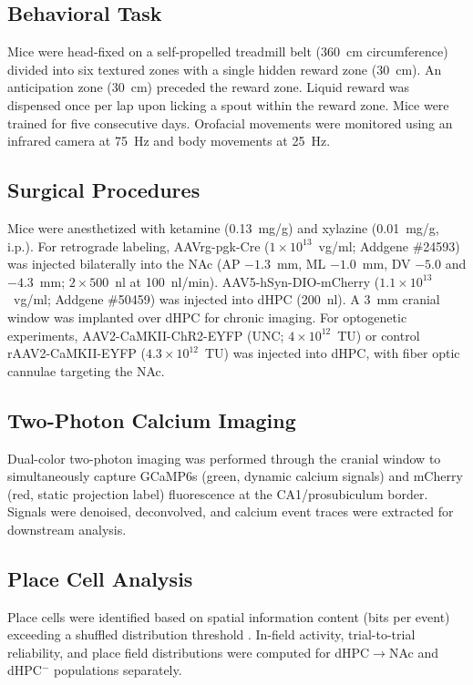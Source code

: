 \documentclass[11pt]{article}
\begin{document}
\subsection{Behavioral Task}

Mice were head-fixed on a self-propelled treadmill belt (360~cm circumference) divided into six textured zones with a single hidden reward zone (30~cm). An anticipation zone (30~cm) preceded the reward zone. Liquid reward was dispensed once per lap upon licking a spout within the reward zone. Mice were trained for five consecutive days. Orofacial movements were monitored using an infrared camera at 75~Hz and body movements at 25~Hz.

\subsection{Surgical Procedures}

Mice were anesthetized with ketamine (0.13~mg/g) and xylazine (0.01~mg/g, i.p.). For retrograde labeling, AAVrg-pgk-Cre ($1 \times 10^{13}$~vg/ml; Addgene \#24593) was injected bilaterally into the NAc (AP $-1.3$~mm, ML $-1.0$~mm, DV $-5.0$ and $-4.3$~mm; $2 \times 500$~nl at 100~nl/min). AAV5-hSyn-DIO-mCherry ($1.1 \times 10^{13}$~vg/ml; Addgene \#50459) was injected into dHPC (200~nl). A 3~mm cranial window was implanted over dHPC for chronic imaging. For optogenetic experiments, AAV2-CaMKII-ChR2-EYFP (UNC; $4 \times 10^{12}$~TU) or control rAAV2-CaMKII-EYFP ($4.3 \times 10^{12}$~TU) was injected into dHPC, with fiber optic cannulae targeting the NAc.

\subsection{Two-Photon Calcium Imaging}

Dual-color two-photon imaging was performed through the cranial window to simultaneously capture GCaMP6s (green, dynamic calcium signals) and mCherry (red, static projection label) fluorescence at the CA1/prosubiculum border. Signals were denoised, deconvolved, and calcium event traces were extracted for downstream analysis.

\subsection{Place Cell Analysis}

Place cells were identified based on spatial information content (bits per event) exceeding a shuffled distribution threshold \citep{Skaggs1993}. In-field activity, trial-to-trial reliability, and place field distributions were computed for dHPC$\to$NAc and dHPC$^-$ populations separately.
\end{document}
